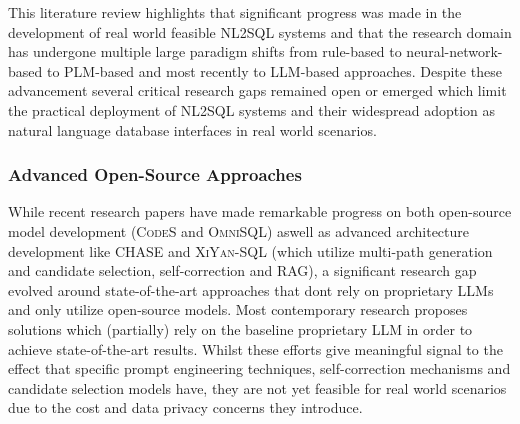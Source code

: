 \documentclass{article}
\begin{document}
This literature review highlights that significant progress was made in the development of real world feasible NL2SQL systems
and that the research domain has undergone multiple large paradigm shifts from rule-based to neural-network-based to PLM-based
and most recently to LLM-based approaches. Despite these advancement several critical research gaps remained open or emerged
which limit the practical deployment of NL2SQL systems and their widespread adoption as natural language database interfaces
in real world scenarios.

\subsubsection{Advanced Open-Source Approaches}

While recent research papers have made remarkable progress on both open-source model development (\textsc{CodeS} and
\textsc{OmniSQL}) aswell as advanced architecture development like CHASE and \textsc{XiYan-SQL} (which utilize multi-path
generation and candidate selection, self-correction and RAG), a significant research gap evolved around state-of-the-art
approaches that dont rely on proprietary LLMs and only utilize open-source models. Most contemporary research proposes
solutions which (partially) rely on the baseline proprietary LLM in order to achieve state-of-the-art results. Whilst
these efforts give meaningful signal to the effect that specific prompt engineering techniques, self-correction mechanisms
and candidate selection models have, they are not yet feasible for real world scenarios due to the cost and data privacy
concerns they introduce.
\end{document}
